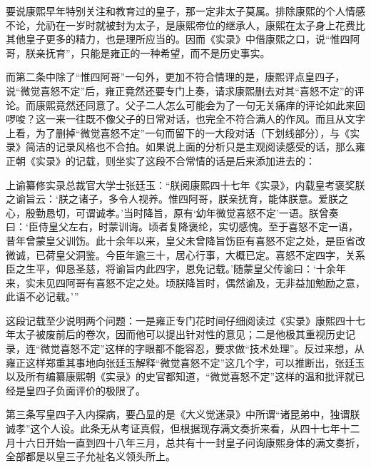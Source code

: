 
要说康熙早年特别关注和教育过的皇子，那一定非太子莫属。排除康熙的个人情感不论，允礽在一岁时就被封为太子，是康熙帝位的继承人，康熙在太子身上花费比其他皇子更多的精力，也是理所应当的。因而《实录》中借康熙之口，说“惟四阿哥，朕亲抚育”，只能是雍正的一种希望，而不是历史事实。



而第二条中除了“惟四阿哥”一句外，更加不符合情理的是，康熙评点皇四子，说“微觉喜怒不定”后，雍正竟然还要专门上奏，请求康熙删去对其“喜怒不定”的评论。而康熙竟然还同意了。父子二人怎么可能会为了一句无关痛痒的评论如此来回啰唆？这一来一往既不像父子的日常对话，也完全不符合满人的作风。而且从文字上看，为了删掉“微觉喜怒不定”一句而留下的一大段对话（下划线部分），与《实录》简洁的记录风格也不合拍。如果说上面的分析只是主观阅读感受的话，那么雍正朝《实录》的记载，则坐实了这段不合常情的话是后来添加进去的：



\begin{bookquote}上谕纂修实录总裁官大学士张廷玉：“朕阅康熙四十七年《实录》，内载皇考褒奖朕之谕旨云：‘朕之诸子，多令人视养。惟四阿哥，朕亲抚育，能体朕意。爱朕之心，殷勤恳切，可谓诚孝。’当时降旨，原有‘幼年微觉喜怒不定’一语。朕曾奏曰：‘臣侍皇父左右，时蒙训诲。顷者复降褒纶，实切感愧。至于喜怒不定一语，昔年曾蒙皇父训饬。此十余年以来，皇父未曾降旨饬臣有喜怒不定之处，是臣省改微诚，已荷皇父洞鉴。今臣年逾三十，居心行事，大概已定。喜怒不定四字，关系臣之生平，仰恳圣慈，将谕旨内此四字，恩免记载。’随蒙皇父传谕曰：‘十余年来，实未见四阿哥有喜怒不定之处。顷朕降旨时，偶然谕及，无非益加勉励之意，此语不必记载。’”\end{bookquote}


这段记载至少说明两个问题：一是雍正专门花时间仔细阅读过《实录》康熙四十七年太子被废前后的卷次，因而他可以提出针对性的意见；二是他极其重视历史记录，连“微觉喜怒不定”这样的字眼都不能容忍，要求做“技术处理”。反过来想，从雍正这样郑重其事地向张廷玉解释“微觉喜怒不定”这几个字，可以推断出，张廷玉以及所有编纂康熙朝《实录》的史官都知道，“微觉喜怒不定”这样的温和批评就已经是皇四子负面评价的极限了。



第三条写皇四子入内探病，要凸显的是《大义觉迷录》中所谓“诸昆弟中，独谓朕诚孝”这个人设。此条无从考证真假，但根据现存满文奏折来看，从四十七年十二月十六日开始一直到四十八年三月，总共有十一封皇子问询康熙身体的满文奏折，全部都是以皇三子允祉名义领头所上。


